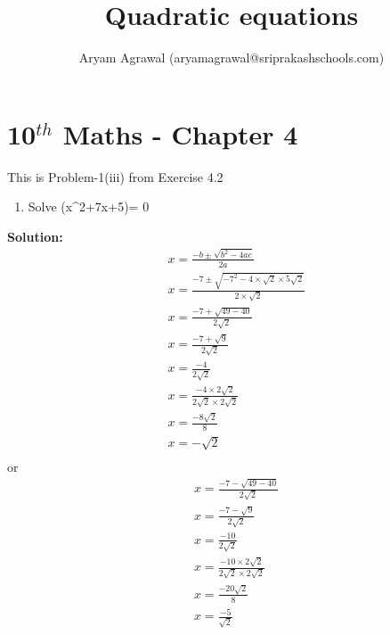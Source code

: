 \documentclass[12pt]{article}
\title{\textbf{Quadratic equations}}
\author{Aryam Agrawal (aryamagrawal@sriprakashschools.com)}
\newcommand{\solution}{\noindent \textbf{Solution: }}
\begin{document}
\maketitle
\section*{10$^{th}$ Maths - Chapter 4} 
This is Problem-1(iii) from Exercise 4.2\\
\begin{enumerate}
    \item Solve (x^2+7x+5)= 0
\end{enumerate}


\solution\\
\begin{align}
&x=\frac{-b\pm\sqrt{b^2-4ac}}{2a}\\
&x=\frac{-7\pm\sqrt{-7^2-4 \times \sqrt{2}\times5\sqrt{2}}}{2 \times \sqrt{2}}\\
&x=\frac{-7+\sqrt{49-40}}{2\sqrt{2}}\\
&x=\frac{-7+\sqrt{9}}{2\sqrt{2}}\\
&x=\frac{-4}{2\sqrt{2}}\\
&x=\frac{-4\times 2\sqrt{2}}{2\sqrt{2}\times2\sqrt{2}}\\
&x=\frac{-8\sqrt{2}}{8}\\
&x=-\sqrt{2}\\
\end{align}
or\\
\begin{align}
&x=\frac{-7-\sqrt{49-40}}{2\sqrt{2}}\\
&x=\frac{-7-\sqrt{9}}{2\sqrt{2}}\\
&x=\frac{-10}{2\sqrt{2}}\\
&x=\frac{-10\times 2\sqrt{2}}{2\sqrt{2}\times2\sqrt{2}}\\
&x=\frac{-20\sqrt{2}}{8}\\
&x=\frac{-5}{\sqrt{2}}
\end{align}
\end{document}
